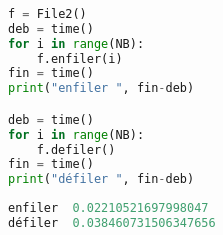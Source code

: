\documentclass[svgnames,11pt]{beamer}
\begin{document}
\begin{frame}[fragile]
    \frametitle{}

\begin{lstlisting}[language=Python , basicstyle=\ttfamily\small, xleftmargin=2em, xrightmargin=2em]
f = File2()
deb = time()
for i in range(NB):
    f.enfiler(i)
fin = time()
print("enfiler ", fin-deb)

deb = time()
for i in range(NB):
    f.defiler()
fin = time()
print("défiler ", fin-deb)
\end{lstlisting}
\begin{lstlisting}[language=Python , basicstyle=\ttfamily\small, xleftmargin=2em, xrightmargin=2em]
enfiler  0.02210521697998047
défiler  0.038460731506347656
\end{lstlisting}
\end{frame}
\end{document}
